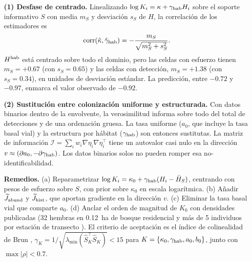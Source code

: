\documentclass[11pt,letterpaper]{article}
\begin{document}
\textbf{(1) Desfase de centrado.} Linealizando $\log K_i=\kappa+\gamma_{\rm hab}H_i$ sobre el soporte informativo $S$ con media $m_S$ y desviación $s_S$ de $H$, la correlación de los estimadores es
\begin{equation}
\operatorname{corr}(\hat\kappa,\hat\gamma_{\rm hab})=-\frac{m_S}{\sqrt{m_S^2+s_S^2}}.
\end{equation}
$H^{\rm hab}$ está centrado sobre todo el dominio, pero las celdas con esfuerzo tienen $m_S=+0.67$ (con $s_S=0.65$) y las celdas con detección, $m_S=+1.38$ (con $s_S=0.34$), en unidades de desviación estándar. La predicción, entre $-0.72$ y $-0.97$, enmarca el valor observado de $-0.92$.

\textbf{(2) Sustitución entre colonización uniforme y estructurada.} Con datos binarios dentro de la envolvente, la verosimilitud informa sobre todo del total de detecciones y de una ordenación gruesa. La tasa uniforme ($a_0$, que incluye la tasa basal vial) y la estructura por hábitat ($\gamma_{\rm hab}$) son entonces sustitutas. La matriz de información $\mathcal I=\sum_iw_i\nabla\eta_i\nabla\eta_i^\top$ tiene un autovalor casi nulo en la dirección $v\approx(\partial a_0,-\partial\gamma_{\rm hab})$. Los datos binarios solos no pueden romper esa no-identificabilidad.

\textbf{Remedios.} (a) Reparametrizar $\log K_i=\kappa_0+\gamma_{\rm hab}(H_i-\bar H_S)$, centrando con pesos de esfuerzo sobre $S$, con prior sobre $\kappa_0$ en escala logarítmica. (b) Añadir $\widetilde J_{\rm abund}$ y $\widetilde J_{\rm hist}$, que aportan gradiente en la dirección $v$. (c) Eliminar la tasa basal vial que comparte $a_0$. (d) Anclar el orden de magnitud de $K_0$ con densidades publicadas (32 hembras en 0.12~ha de bosque residencial y más de 5 individuos por estación de transecto \cite{pemberton2025,nelsen2023}). El criterio de aceptación es el índice de colinealidad de Brun \cite{brun2001,soetaert2009}, $\gamma_K=1/\sqrt{\lambda_{\min}(\hat S_K^\top\hat S_K)}<15$ para $K=\{\kappa_0,\gamma_{\rm hab},a_0,b_0\}$, junto con $\max|\rho|<0.7$.
\end{document}
